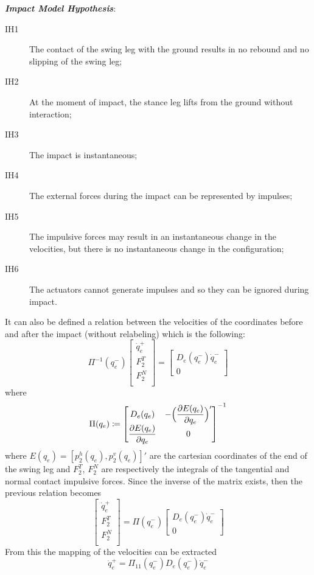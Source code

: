 \documentclass[11pt]{article}
\begin{document}
\textit{\textbf{Impact Model Hypothesis}}:
\begin{description}
\item[IH1] The contact of the swing leg with the ground results in no rebound and no slipping of the swing leg;
\item[IH2] At the moment of impact, the stance leg lifts from the ground without interaction;
\item[IH3] The impact is instantaneous;
\item[IH4] The external forces during the impact can be represented by impulses;
\item[IH5] The impulsive forces may result in an instantaneous change in the velocities, but there is no instantaneous change in the configuration;
\item[IH6] The actuators cannot generate impulses and so they can be ignored during impact.
\end{description}

It can also be defined a relation between the velocities of the coordinates before and after the impact (without relabeling) which is the following:
\begin{equation}
\Pi^{-1} (q^-_e)
\begin{bmatrix}
\dot{q}^+_e \\
F^T_2 \\
F^N_2 \\
\end{bmatrix}
= 
\begin{bmatrix}
D_e(q^-_e)\dot{q}^-_e \\
0
\end{bmatrix}
\end{equation}
where 
\begin{equation*}
\Pi(q_e) \coloneqq
\begin{bmatrix}
D_e(q_e) & - \Bigl(\dfrac{\partial E(q_e)}{\partial q_e} \Bigr)' \\
\dfrac{\partial E(q_e)}{\partial q_e} & 0 \\
\end{bmatrix}^{-1}
\end{equation*}
where $E(q_e) = [p^h_2(q_e),p^v_2(q_e)]'$ are the cartesian coordinates of the end of the swing leg and $F^T_2$, $F^N_2$ are respectively the integrals of the tangential and normal contact impulsive forces.
Since the inverse of the matrix exists, then the previous relation becomes
\begin{equation}
\begin{bmatrix}
\dot{q}^+_e \\
F^T_2 \\
F^N_2 \\
\end{bmatrix}
= 
\Pi(q^-_e)
\begin{bmatrix}
D_e(q^-_e)\dot{q}^-_e \\
0
\end{bmatrix}
\end{equation}
From this the mapping of the velocities can be extracted
\begin{equation}
\dot{q}^+_e = \Pi_{11}(q^-_e)D_e(q^-_e)\dot{q}^-_e
\end{equation}
\end{document}
